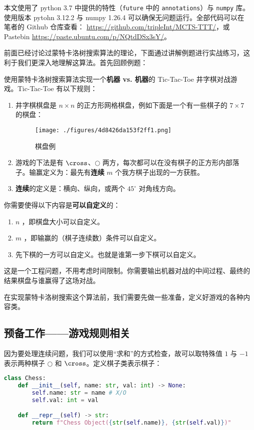 

本文使用了 python 3.7 中提供的特性（\verb`future` 中的 \verb`annotations`）与 \verb`numpy` 库。使用版本 pytohn 3.12.2 与 numpy 1.26.4 可以确保无问题运行。全部代码可以在笔者的 Github 仓库查看：
\href{https://github.com/tripleInt/MCTS-TTT/}{https://github.com/tripleInt/MCTS-TTT/}，或 Pastebin \href{https://paste.ubuntu.com/p/NQtdDSx3sY/}{https://paste.ubuntu.com/p/NQtdDSx3sY/}。

前面已经讨论过蒙特卡洛树搜索算法的理论，下面通过讲解例题进行实战练习，这利于我们更深入地理解这算法。首先回顾例题：
\begin{example}{}
使用蒙特卡洛树搜索算法实现一个\textbf{机器 vs. 机器}的 Tic-Tac-Toe 井字棋对战游戏。Tic-Tac-Toe 有以下规则：
\begin{enumerate}
\item 井字棋棋盘是 $n \times n$ 的正方形网格棋盘，例如下面是一个有一些棋子的 $7 \times 7$ 的棋盘：
\begin{figure}[ht]
\centering
\texttt{[image: ./figures/4d8426da153f2ff1.png]}
\caption{棋盘例} \label{fig_MCTSci_2}
\end{figure}
\item 游戏的下法是有 $\cross$、$\bigcirc$ 两方，每次都可以在没有棋子的正方形内部落子。输赢定义为：最先有\textbf{连续} $m$ 个我方棋子出现的一方获胜。
\item \textbf{连续}的定义是：横向、纵向，或两个 $45^\circ$ 对角线方向。
\end{enumerate}

你需要使得以下内容是\textbf{可以自定义}的：
\begin{enumerate}
\item $n$ ，即棋盘大小可以自定义。
\item $m$ ，即输赢的（棋子连续数）条件可以自定义。
\item 先下棋的一方可以自定义。也就是谁第一步下棋可以自定义。
\end{enumerate}

这是一个工程问题，不用考虑时间限制。你需要输出机器对战的中间过程、最终的结果棋盘与谁赢得了这场对战。
\end{example}
在实现蒙特卡洛树搜索这个算法前，我们需要先做一些准备，定义好游戏的各种内容类。
\subsection{预备工作——游戏规则相关}
因为要处理连续问题，我们可以使用“求和”的方式检查，故可以取特殊值 $1$ 与 $-1$ 表示两种棋子 $\bigcirc$ 和 $\cross$。定义棋子类表示棋子：
\begin{lstlisting}[language=python]
class Chess:
    def __init__(self, name: str, val: int) -> None:
        self.name: str = name # X/O
        self.val: int = val

    def __repr__(self) -> str:
        return f"Chess Object({str(self.name)}, {str(self.val)})"
\end{lstlisting}

